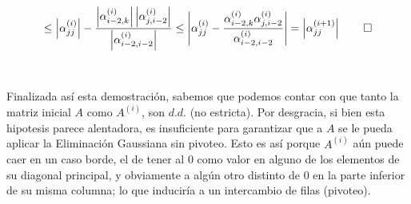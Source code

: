 \begin{equation}
\leq \left | \alpha_{jj}^{(i)} \right | - \frac{\left | \alpha_{i-2,k}^{(i)} \right | \left |\alpha_{j,i-2}^{(i)} \right | }{ \left | \alpha_{i-2,i-2}^{(i)} \right | } \leq \left | \alpha_{jj}^{(i)} - \frac{\alpha_{i-2,k}^{(i)}\alpha_{j,i-2}^{(i)}}{\alpha_{i-2,i-2}^{(i)}} \right | = \left | \alpha_{jj}^{(i+1)} \right | \qed
\end{equation}
\\
\\
Finalizada así esta demostraci\'on, sabemos que podemos contar con que tanto la matriz inicial $A$ como $A^{(i)}$, son $d.d.$ (no estricta). Por desgracia, si bien esta hipotesis parece alentadora, es insuficiente para garantizar que a $A$ se le pueda aplicar la Eliminaci\'on Gaussiana sin pivoteo. Esto es así porque $A^{(i)}$ a\'un puede caer en un caso borde, el de tener al $0$ como valor en alguno de los elementos de su diagonal principal, y obviamente a alg\'un otro distinto de $0$ en la parte inferior de su misma columna; lo que induciría a un intercambio de filas (pivoteo).

